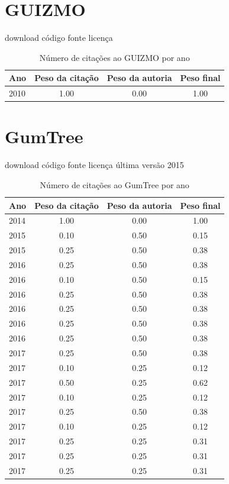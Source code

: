 \section{GUIZMO}
\checkmark download
\checkmark código fonte
\checkmark licença
\begin{table}[H]
\caption{Número de citações ao GUIZMO por ano}
\centering
\begin{tabular}{| l | c | c | c |}
  \hline
  Ano & Peso da citação & Peso da autoria & Peso final \\
  \hline
  2010
    & 1.00
    & 0.00
    & {\color{blue} 1.00} \\
\hline
\end{tabular}
\end{table}
\section{GumTree}
\checkmark download
\checkmark código fonte
\checkmark licença
\checkmark última versão 2015
\begin{table}[H]
\caption{Número de citações ao GumTree por ano}
\centering
\begin{tabular}{| l | c | c | c |}
  \hline
  Ano & Peso da citação & Peso da autoria & Peso final \\
  \hline
  2014
    & 1.00
    & 0.00
    & {\color{blue} 1.00} \\
\hline
  2015
    & 0.10
    & 0.50
    & {\color{red} 0.15} \\
  2015
    & 0.25
    & 0.50
    & {\color{red} 0.38} \\
\hline
  2016
    & 0.25
    & 0.50
    & {\color{red} 0.38} \\
  2016
    & 0.10
    & 0.50
    & {\color{red} 0.15} \\
  2016
    & 0.25
    & 0.50
    & {\color{red} 0.38} \\
  2016
    & 0.25
    & 0.50
    & {\color{red} 0.38} \\
  2016
    & 0.25
    & 0.50
    & {\color{red} 0.38} \\
  2016
    & 0.25
    & 0.50
    & {\color{red} 0.38} \\
\hline
  2017
    & 0.25
    & 0.50
    & {\color{red} 0.38} \\
  2017
    & 0.10
    & 0.25
    & {\color{red} 0.12} \\
  2017
    & 0.50
    & 0.25
    & {\color{blue} 0.62} \\
  2017
    & 0.10
    & 0.25
    & {\color{red} 0.12} \\
  2017
    & 0.25
    & 0.50
    & {\color{red} 0.38} \\
  2017
    & 0.10
    & 0.25
    & {\color{red} 0.12} \\
  2017
    & 0.25
    & 0.25
    & {\color{red} 0.31} \\
  2017
    & 0.25
    & 0.25
    & {\color{red} 0.31} \\
  2017
    & 0.25
    & 0.25
    & {\color{red} 0.31} \\
\hline
\end{tabular}
\end{table}
